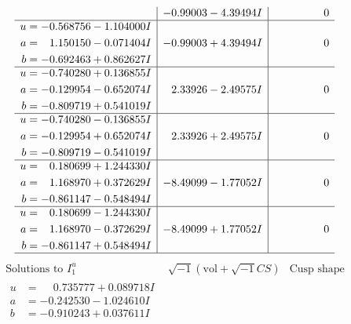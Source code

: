 \documentclass[1p]{elsarticle_modified}
\theoremstyle{definition}
\newcommand{\I}{\sqrt{-1}}
\begin{document}
$$\begin{array}{c|c|c}
 & -0.99003 - 4.39494 I & \phantom{-0.000000 } 0 \\ \hline\begin{aligned}
u &= -0.568756 - 1.104000 I \\
a &= \phantom{-}1.150150 - 0.071404 I \\
b &= -0.692463 + 0.862627 I\end{aligned}
 & -0.99003 + 4.39494 I & \phantom{-0.000000 } 0 \\ \hline\begin{aligned}
u &= -0.740280 + 0.136855 I \\
a &= -0.129954 - 0.652074 I \\
b &= -0.809719 + 0.541019 I\end{aligned}
 & \phantom{-}2.33926 - 2.49575 I & \phantom{-0.000000 } 0 \\ \hline\begin{aligned}
u &= -0.740280 - 0.136855 I \\
a &= -0.129954 + 0.652074 I \\
b &= -0.809719 - 0.541019 I\end{aligned}
 & \phantom{-}2.33926 + 2.49575 I & \phantom{-0.000000 } 0 \\ \hline\begin{aligned}
u &= \phantom{-}0.180699 + 1.244330 I \\
a &= \phantom{-}1.168970 + 0.372629 I \\
b &= -0.861147 - 0.548494 I\end{aligned}
 & -8.49099 - 1.77052 I & \phantom{-0.000000 } 0 \\ \hline\begin{aligned}
u &= \phantom{-}0.180699 - 1.244330 I \\
a &= \phantom{-}1.168970 - 0.372629 I \\
b &= -0.861147 + 0.548494 I\end{aligned}
 & -8.49099 + 1.77052 I & \phantom{-0.000000 } 0\\
 \hline 
 \end{array}$$\newpage$$\begin{array}{c|c|c}  
\text{Solutions to }I^u_{1}& \I (\text{vol} + \sqrt{-1}CS) & \text{Cusp shape}\\
 \hline 
\begin{aligned}
u &= \phantom{-}0.735777 + 0.089718 I \\
a &= -0.242530 - 1.024610 I \\
b &= -0.910243 + 0.037611 I\end{aligned}

\end{array}$$
\end{document}
